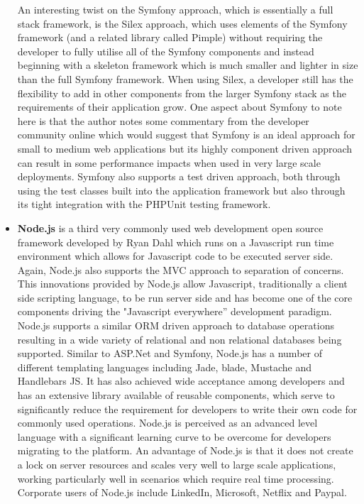 \documentclass[a4paper,12pt]{article}
\begin{document}
\begin{itemize}
An interesting twist on the Symfony approach, which is essentially a full stack framework, is the Silex approach, which uses elements of the Symfony framework (and a related library called Pimple) without requiring the developer to fully utilise all of the Symfony components and instead beginning with a skeleton framework which is much smaller and lighter in size than the full Symfony framework. When using Silex, a developer still has the flexibility to add in other components from the larger Symfony stack as the requirements of their application grow. One aspect about Symfony to note here is that the author notes some commentary from the developer community online which would suggest that Symfony is an ideal approach for small to medium web applications but its highly component driven approach can result in some performance impacts when used in very large scale deployments. Symfony also supports a test driven approach, both through using the test classes built into the application framework but also through its tight integration with the PHPUnit testing framework.
\item \textbf{Node.js} is a third very commonly used web development open source framework developed by Ryan Dahl which runs on a Javascript run time environment which allows for Javascript code to be executed server side. Again, Node.js also supports the MVC approach to separation of concerns. This innovations provided by Node.js allow Javascript, traditionally a client side scripting language, to be run server side and has become one of the core components driving the "Javascript everywhere'' development paradigm. Node.js supports a similar ORM driven approach to database operations resulting in a wide variety of relational and non relational databases being supported. Similar to ASP.Net and Symfony, Node.js has a number of different templating languages including Jade, blade, Mustache and Handlebars JS. It has also achieved wide acceptance among developers and has an extensive library available of reusable components, which serve to significantly reduce the requirement for developers to write their own code for commonly used operations. Node.js is perceived as an advanced level language with a significant learning curve to be overcome for developers migrating to the platform. An advantage of Node.js is that it does not create a lock on server resources and scales very well to large scale applications, working particularly well in scenarios which require real time processing. Corporate users of Node.js include LinkedIn, Microsoft, Netflix and Paypal.
\end{itemize}
\end{document}
